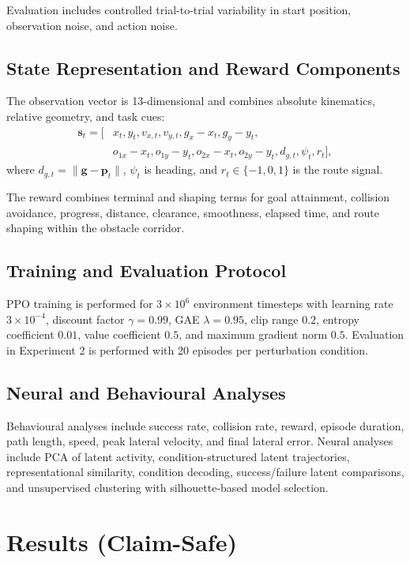 Evaluation includes controlled trial-to-trial variability in start position, observation noise, and action noise.

\subsection{State Representation and Reward Components}

The observation vector is 13-dimensional and combines absolute kinematics, relative geometry, and task cues:
\begin{align}
\mathbf{s}_t = [&x_t, y_t, v_{x,t}, v_{y,t}, g_x-x_t, g_y-y_t, \\
& o_{1x}-x_t, o_{1y}-y_t, o_{2x}-x_t, o_{2y}-y_t, d_{g,t}, \psi_t, r_t],
\end{align}
where $d_{g,t}=\lVert \mathbf{g}-\mathbf{p}_t \rVert$, $\psi_t$ is heading, and $r_t\in\{-1,0,1\}$ is the route signal.

The reward combines terminal and shaping terms for goal attainment, collision avoidance, progress, distance, clearance, smoothness, elapsed time, and route shaping within the obstacle corridor.

\subsection{Training and Evaluation Protocol}

PPO training is performed for $3\times10^6$ environment timesteps with learning rate $3\times10^{-4}$, discount factor $\gamma=0.99$, GAE $\lambda=0.95$, clip range $0.2$, entropy coefficient $0.01$, value coefficient $0.5$, and maximum gradient norm $0.5$. Evaluation in Experiment 2 is performed with 20 episodes per perturbation condition.

\subsection{Neural and Behavioural Analyses}

Behavioural analyses include success rate, collision rate, reward, episode duration, path length, speed, peak lateral velocity, and final lateral error. Neural analyses include PCA of latent activity, condition-structured latent trajectories, representational similarity, condition decoding, success/failure latent comparisons, and unsupervised clustering with silhouette-based model selection.

\section{Results (Claim-Safe)}
\label{sec:results_claim_safe}

